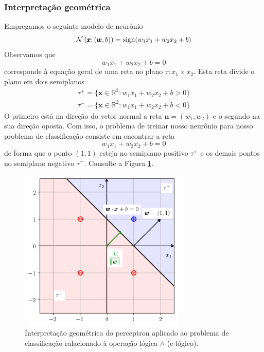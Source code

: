 \subsubsection{Interpretação geométrica}

Empregamos o seguinte modelo de neurônio
\begin{equation}
  \mathcal{N}\left(\pmb{x};(\pmb{w},b)\right) = \operatorname{sign}(w_1x_1 + w_2x_2 + b)
\end{equation}
Observamos que
\begin{equation}
  w_1x_1 + w_2x_2 + b = 0
\end{equation}
corresponde à equação geral de uma reta no plano $\tau: x_1\times x_2$. Esta reta divide o plano em dois semiplanos
\begin{align}
  \tau^+ = \{\pmb{x}\in\mathbb{R}^2: w_1x_1 + w_2x_2 + b > 0\}\\
  \tau^- = \{\pmb{x}\in\mathbb{R}^2: w_1x_1 + w_2x_2 + b < 0\}
\end{align}
O primeiro está na direção do vetor normal a reta $\pmb{n} = (w_1, w_2)$ e o segundo na sua direção oposta. Com isso, o problema de treinar nosso neurônio para nosso problema de classificação consiste em encontrar a reta
\begin{equation}
  w_1x_1 + w_2x_2 + b = 0
\end{equation}
de forma que o ponto $(1,1)$ esteja no semiplano positivo $\tau^+$ e os demais pontos no semiplano negativo $\tau^-$. Consulte a Figura \ref{fig:class_e}.

\begin{figure}[H]
  \centering
  \includegraphics[width=0.7\textwidth]{./cap_perceptron/dados/fig_class_e/main}
  \caption{Interpretação geométrica do perceptron aplicado ao problema de classificação ralacionado à operação lógica $\land$ (e-lógico).}
  \label{fig:class_e}
\end{figure}

